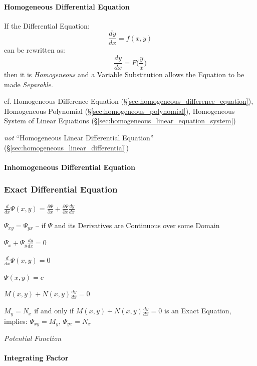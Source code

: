 {\paragraph{Homogeneous Differential Equation}
\label{sec:homogeneous_differential_equation}

If the Differential Equation:
\[
  \frac{dy}{dx} = f(x,y)
\]
can be rewritten as:
\[
  \frac{dy}{dx} = F\Big(\frac{y}{x}\Big)
\]
then it is \emph{Homogeneous} and a Variable Substitution allows the Equation to
be made \emph{Separable}.

cf. Homogeneous Difference Equation
(\S\ref{sec:homogeneous_difference_equation}), Homogeneous Polynomial
(\S\ref{sec:homogeneous_polynomial}), Homogeneous System of Linear Equations
(\S\ref{sec:homogeneous_linear_equation_system})

\emph{not} ``Homogeneous Linear Differential Equation''
(\S\ref{sec:homogeneous_linear_differential})



\paragraph{Inhomogeneous Differential Equation}
\label{sec:inhomogeneous_differential_equation}



\subsubsection{Exact Differential Equation}\label{sec:exact_equation}

$\frac{d}{dx}\Psi(x,y) = \frac{\partial{\Psi}}{\partial{x}}
  + \frac{\partial{\Psi}}{\partial{x}}\frac{dy}{dx}$

$\Psi_{xy} = \Psi_{yx}$ -- if $\Psi$ and its Derivatives are Continuous over
some Domain

$\Psi_x + \Psi_y \frac{dy}{dx} = 0$

$\frac{d}{dx}\Psi(x,y) = 0$

$\Psi(x,y) = c$

$M(x,y) + N(x,y)\frac{dy}{dx} = 0$

$M_y = N_x$ if and only if $M(x,y) + N(x,y)\frac{dy}{dx} = 0$ is an Exact
Equation, implies: $\Psi_{xy} = M_y$, $\Psi_{yx} = N_x$

\emph{Potential Function}



\paragraph{Integrating Factor}\label{sec:integrating_factor}\hfill

}
